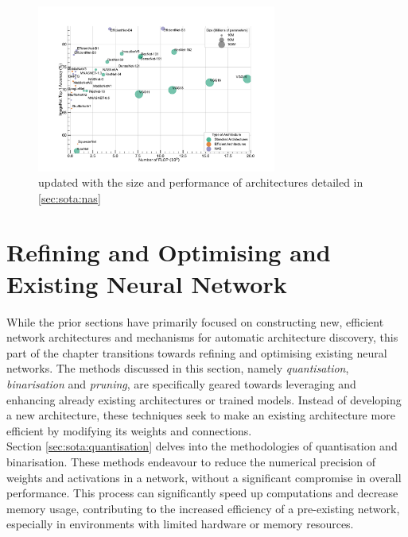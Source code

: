 \begin{figure}[htbp]
    \centering
    \includegraphics[width=0.70\textwidth]{chapter_sota/assets/network_sizes_normal_eff_nas.pdf}
    \caption{ updated with the size and
    performance of architectures detailed in \cref{sec:sota:nas}}
    \label{fig:sota:net_sizes_std_eff_nas}
\end{figure}


\section{Refining and Optimising and Existing Neural Network}\label{sec:sota:refining_existing} 

While the prior sections have primarily focused on constructing new, efficient
network architectures and mechanisms for automatic architecture discovery, this
part of the chapter transitions towards refining and optimising existing neural
networks. The methods discussed in this section, namely \emph{quantisation},
\emph{binarisation} and \emph{pruning}, are specifically geared towards
leveraging and enhancing already existing architectures or trained models.
Instead of developing a new architecture, these techniques seek to make an
existing architecture more efficient by modifying its weights and connections.\\

Section \cref{sec:sota:quantisation} delves into the methodologies of
quantisation and binarisation. These methods endeavour to reduce the numerical
precision of weights and activations in a network, without a significant
compromise in overall performance. This process can significantly speed up
computations and decrease memory usage, contributing to the increased efficiency
of a pre-existing network, especially in environments with limited hardware or
memory resources.\\

